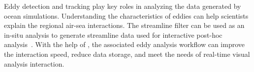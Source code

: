 Eddy detection and tracking play key roles in analyzing the data generated by ocean simulations. Understanding the characteristics of eddies can help scientists explain the regional air-sea interactions.
The \vtkm streamline filter can be used as an in-situ analysis to generate streamline data used for interactive post-hoc analysis~\citep{Han2022}. With the help of \vtkm, the associated eddy analysis workflow can improve the interaction speed, reduce data storage, and meet the
needs of real-time visual analysis interaction.  

